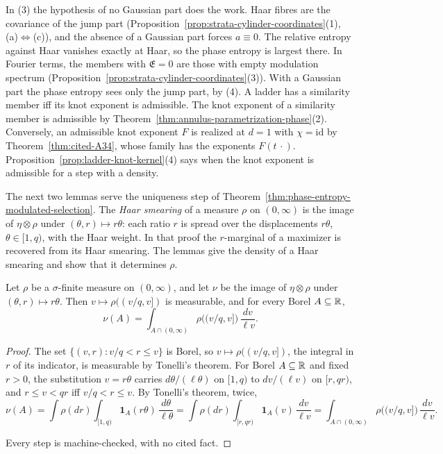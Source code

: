 In (3) the hypothesis of no Gaussian part does the work. Haar fibres are the covariance of the jump
part (Proposition~\ref{prop:strata-cylinder-coordinates}(1), (a)$\Leftrightarrow$(c)), and the
absence of a Gaussian part forces $a \equiv 0$. The relative entropy against Haar vanishes exactly
at Haar, so the phase entropy is largest there. In
Fourier terms, the members with $\mathfrak{E} = 0$ are those with empty modulation spectrum
(Proposition~\ref{prop:strata-cylinder-coordinates}(3)). With a Gaussian part the phase entropy sees
only the jump part, by (4). A ladder has a similarity member iff its knot exponent is admissible. The knot exponent of a
similarity member is admissible by Theorem~\ref{thm:annulus-parametrization-phase}(2). Conversely,
an admissible knot exponent $F$ is realized at $d = 1$ with $\chi = \mathrm{id}$ by
Theorem~\ref{thm:cited-A34}, whose family has the exponents $F(t\,\cdot)$.
Proposition~\ref{prop:ladder-knot-kernel}(4) says when the knot exponent is admissible for a step
with a \Levy{} density.

The next two lemmas serve the uniqueness step of Theorem~\ref{thm:phase-entropy-modulated-selection}.
The \emph{Haar smearing} of a measure $\rho$ on $(0,\infty)$ is the image of $\eta \otimes \rho$
under $(\theta, r) \mapsto r\theta$: each ratio $r$ is spread over the displacements $r\theta$,
$\theta \in [1,q)$, with the Haar weight. In that proof the $r$-marginal of a maximizer is recovered
from its Haar smearing. The lemmas give the density of a Haar smearing and show that it determines
$\rho$.

\begin{lemma}
\label{lem:haar-smearing-density}

Let $\rho$ be a $\sigma$-finite measure on $(0,\infty)$, and let $\nu$ be the image of
$\eta \otimes \rho$ under $(\theta, r) \mapsto r\theta$. Then $v \mapsto \rho((v/q, v])$ is
measurable, and for every Borel $A \subseteq \mathbb{R}$,
\[
  \nu(A) = \int_{A \cap (0,\infty)}\rho\bigl((v/q, v]\bigr)\,\frac{dv}{\ell v} .
\]
\end{lemma}

\begin{proof}
The set $\{(v, r) : v/q < r \le v\}$ is Borel, so $v \mapsto \rho((v/q, v])$, the integral in $r$ of
its indicator, is measurable by Tonelli's theorem. For Borel $A \subseteq \mathbb{R}$ and fixed $r > 0$,
the substitution $v = r\theta$ carries $d\theta/(\ell\theta)$ on $[1,q)$ to $dv/(\ell v)$ on
$[r,qr)$, and $r \le v < qr$ iff $v/q < r \le v$. By Tonelli's theorem, twice,
\[
  \nu(A) = \int\rho(dr)\int_{[1,q)}\mathbf 1_A(r\theta)\,\frac{d\theta}{\ell\theta}
  = \int\rho(dr)\int_{[r,qr)}\mathbf 1_A(v)\,\frac{dv}{\ell v}
  = \int_{A \cap (0,\infty)}\rho\bigl((v/q, v]\bigr)\,\frac{dv}{\ell v}.
\]

Every step is machine-checked, with no cited fact.
\end{proof}


